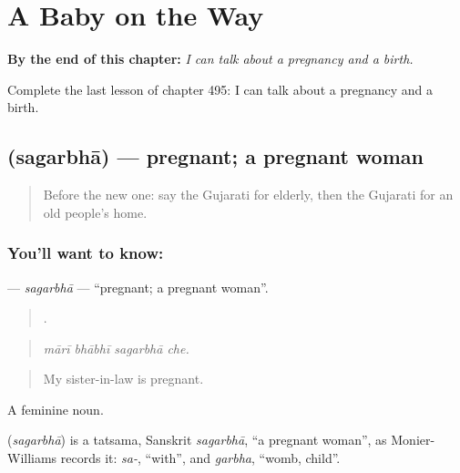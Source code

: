 
\chapter{A Baby on the Way}
\label{ch:gu-a-baby-on-the-way}

\begin{chapteropening}
\textbf{By the end of this chapter:} \emph{I can talk about a pregnancy and a birth.}

Complete the last lesson of chapter 495: I can talk about a pregnancy and a birth.
\end{chapteropening}

\section[\texorpdfstring{\gu{સગર્ભા} (sagarbhā)}{સગર્ભા (sagarbhā)}]{ (sagarbhā) — pregnant; a pregnant woman}

\label{lesson:GU-C495-sagarbha}



\begin{quote}
Before the new one: say the Gujarati for elderly, then the Gujarati for an old people's home.
\end{quote}

\subsection*{You'll want to know: }
\textbf{} — \emph{sagarbhā} — \textquotedblleft{}pregnant; a pregnant woman\textquotedblright{}.

\begin{quote}
   .
\end{quote}

\begin{quote}
\emph{mārī bhābhī sagarbhā che.}
\end{quote}

\begin{quote}
My sister-in-law is pregnant.
\end{quote}

A feminine noun.

\begin{cousinweb}
\textbf{} (\emph{sagarbhā}) is a tatsama, Sanskrit \emph{sagarbhā}, \textquotedblleft{}a pregnant woman\textquotedblright{}, as Monier-Williams records it: \emph{sa-}, \textquotedblleft{}with\textquotedblright{}, and \emph{garbha}, \textquotedblleft{}womb, child\textquotedblright{}.
\end{cousinweb}

